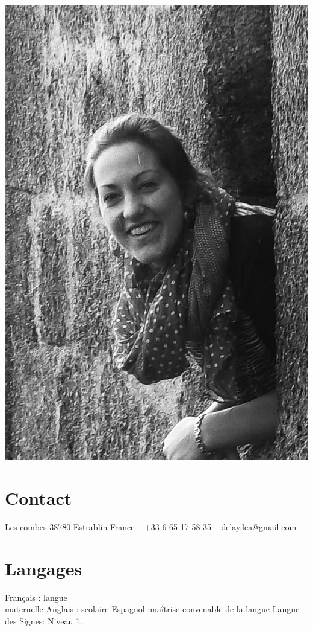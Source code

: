\documentclass[]{cv-lea}
\begin{document}
       
\begin{aside} %
\includegraphics{img/delay_s}
\section{Contact}
Les combes
38780 Estrablin
France
~
+33 6 65 17 58 35
~
{\color{lightgray}{\FA \faEnvelope}} \href{mailto:delay.lea@gmail.com}{\footnotesize delay.lea@gmail.com}
\section{Langages}
Français : langue\\ maternelle
Anglais : scolaire
Espagnol :maîtrise convenable de la langue
Langue des Signes: Niveau 1.
\end{aside}
\end{document}
